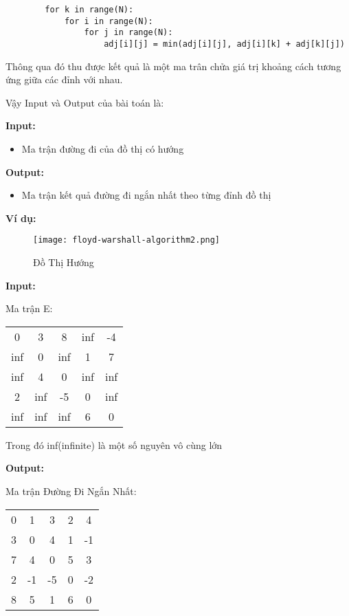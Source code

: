 \documentclass[a4paper]{article}
\begin{document}
\begin{mdframed}[hidealllines=true,backgroundcolor=magenta!10]
		\begin{lstlisting}
		for k in range(N):
            for i in range(N):
                for j in range(N):
                    adj[i][j] = min(adj[i][j], adj[i][k] + adj[k][j])
		\end{lstlisting}
	\end{mdframed}

Thông qua đó thu được kết quả là một ma trân chửa giá trị khoảng cách tương ứng giữa các đỉnh với nhau.

Vậy Input và Output của bài toán là:

\textbf{Input:}

\begin{itemize}
    \item Ma trận đường đi của đồ thị có hướng
\end{itemize}

\textbf{Output:}

\begin{itemize}
    \item Ma trận kết quả đường đi ngắn nhất theo từng đỉnh  đồ thị 
\end{itemize}
\textbf{Ví dụ:}
\begin{figure}[h]
    \centering
    \texttt{[image: floyd-warshall-algorithm2.png]}
    \caption{Đồ Thị Hướng}
\end{figure}

\textbf{Input:}

Ma trận E:

\begin{tabular}{c |c | c | c | c}
     0 & 3 & 8 & inf & -4  \\
     inf & 0 & inf & 1 & 7  \\
     inf & 4 & 0 & inf & inf  \\
     2 & inf & -5 & 0 & inf  \\
     inf & inf & inf & 6 & 0  \\
\end{tabular}

Trong đó inf(infinite) là một số nguyên vô cùng lớn

\textbf{Output:}

Ma trận Đường Đi Ngắn Nhất:

\begin{tabular}{c |c | c | c | c}
     0 & 1 & 3 & 2 & 4  \\
     3 & 0 & 4 & 1 & -1  \\
     7 & 4 & 0 & 5 & 3  \\
     2 & -1 & -5 & 0 & -2  \\
     8 & 5 & 1 & 6 & 0  \\
\end{tabular}
\end{document}
